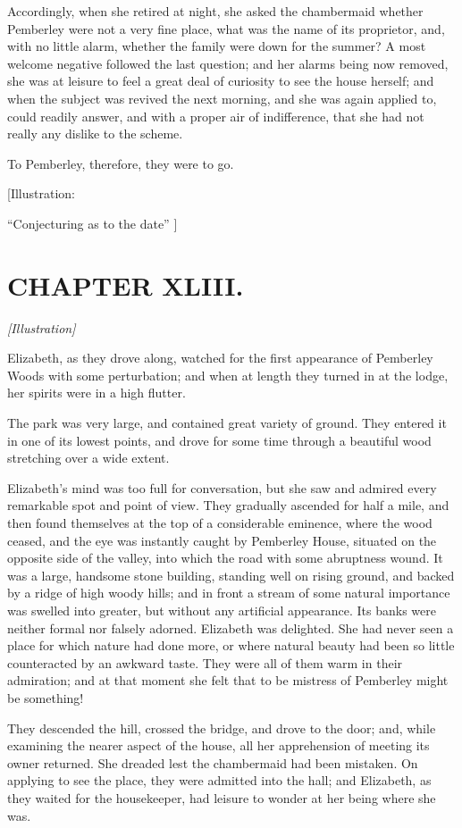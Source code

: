 \documentclass[12pt]{book}
\begin{document}
Accordingly, when she retired at night, she asked the chambermaid whether Pemberley were not a very fine place, what was the name of its proprietor, and, with no little alarm, whether the family were down for the summer? A most welcome negative followed the last question; and her alarms being now removed, she was at leisure to feel a great deal of curiosity to see the house herself; and when the subject was revived the next morning, and she was again applied to, could readily answer, and with a proper air of indifference, that she had not really any dislike to the scheme.

To Pemberley, therefore, they were to go.

[Illustration:

``Conjecturing as to the date'' ]

\chapter{CHAPTER XLIII.}

\emph{[Illustration]}

Elizabeth, as they drove along, watched for the first appearance of Pemberley Woods with some perturbation; and when at length they turned in at the lodge, her spirits were in a high flutter.

The park was very large, and contained great variety of ground. They entered it in one of its lowest points, and drove for some time through a beautiful wood stretching over a wide extent.

Elizabeth's mind was too full for conversation, but she saw and admired every remarkable spot and point of view. They gradually ascended for half a mile, and then found themselves at the top of a considerable eminence, where the wood ceased, and the eye was instantly caught by Pemberley House, situated on the opposite side of the valley, into which the road with some abruptness wound. It was a large, handsome stone building, standing well on rising ground, and backed by a ridge of high woody hills; and in front a stream of some natural importance was swelled into greater, but without any artificial appearance. Its banks were neither formal nor falsely adorned. Elizabeth was delighted. She had never seen a place for which nature had done more, or where natural beauty had been so little counteracted by an awkward taste. They were all of them warm in their admiration; and at that moment she felt that to be mistress of Pemberley might be something!

They descended the hill, crossed the bridge, and drove to the door; and, while examining the nearer aspect of the house, all her apprehension of meeting its owner returned. She dreaded lest the chambermaid had been mistaken. On applying to see the place, they were admitted into the hall; and Elizabeth, as they waited for the housekeeper, had leisure to wonder at her being where she was.
\end{document}
